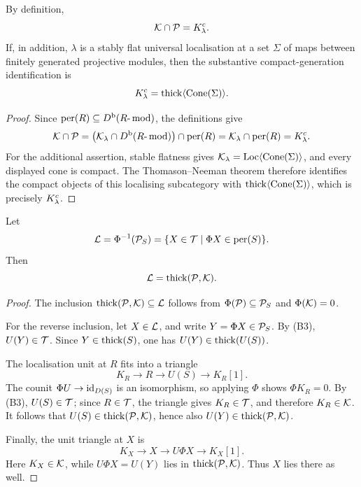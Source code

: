 \begin{lemma}\label{lem:compact-intersection}
By definition,
\[
 \mathcal K\cap\mathcal P=K^c_\lambda.
\]
If, in addition, \(\lambda\) is a stably flat universal localisation at a set \(\Sigma\) of maps between finitely generated projective modules, then the substantive compact-generation identification is
\[
 K^c_\lambda=\operatorname{thick}\langle\operatorname{Cone}(\Sigma)\rangle.
\]
\end{lemma}

\begin{proof}
Since \(\operatorname{per}(R)\subseteq D^{\mathrm b}(R\text{-}\operatorname{mod})\), the definitions give
\[
 \mathcal K\cap\mathcal P
 =\bigl(\mathcal K_\lambda\cap D^{\mathrm b}(R\text{-}\operatorname{mod})\bigr)\cap\operatorname{per}(R)
 =\mathcal K_\lambda\cap\operatorname{per}(R)
 =K^c_\lambda.
\]
For the additional assertion, stable flatness gives
\(\mathcal K_\lambda=\operatorname{Loc}\langle\operatorname{Cone}(\Sigma)\rangle\), and every displayed cone is compact.  The Thomason--Neeman theorem therefore identifies the compact objects of this localising subcategory with \(\operatorname{thick}\langle\operatorname{Cone}(\Sigma)\rangle\), which is precisely \(K^c_\lambda\).
\end{proof}

\begin{lemma}\label{lem:preimage-perfect}
Let
\[
 \mathcal L=\Phi^{-1}(\mathcal P_S)
 =\{X\in\mathcal T\mid \Phi X\in\operatorname{per}(S)\}.
\]
Then
\[
 \mathcal L=\operatorname{thick}(\mathcal P,\mathcal K).
\]
\end{lemma}

\begin{proof}
The inclusion \(\operatorname{thick}(\mathcal P,\mathcal K)\subseteq\mathcal L\) follows from
\(\Phi(\mathcal P)\subseteq\mathcal P_S\) and \(\Phi(\mathcal K)=0\).

For the reverse inclusion, let \(X\in\mathcal L\), and write \(Y=\Phi X\in\mathcal P_S\).  By (B3), \(U(Y)\in\mathcal T\).  Since \(Y\in\operatorname{thick}(S)\), one has
\(U(Y)\in\operatorname{thick}(U(S))\).

The localisation unit at \(R\) fits into a triangle
\[
 K_R\longrightarrow R\longrightarrow U(S)\longrightarrow K_R[1].
\]
The counit \(\Phi U\to\operatorname{id}_{D(S)}\) is an isomorphism, so applying \(\Phi\) shows \(\Phi K_R=0\).  By \textup{(B3)}, \(U(S)\in\mathcal T\); since \(R\in\mathcal T\), the triangle gives \(K_R\in\mathcal T\), and therefore \(K_R\in\mathcal K\).  It follows that
\(U(S)\in\operatorname{thick}(\mathcal P,\mathcal K)\), hence also \(U(Y)\in\operatorname{thick}(\mathcal P,\mathcal K)\).

Finally, the unit triangle at \(X\) is
\[
 K_X\longrightarrow X\longrightarrow U\Phi X\longrightarrow K_X[1].
\]
Here \(K_X\in\mathcal K\), while \(U\Phi X=U(Y)\) lies in
\(\operatorname{thick}(\mathcal P,\mathcal K)\).  Thus \(X\) lies there as well.
\end{proof}


